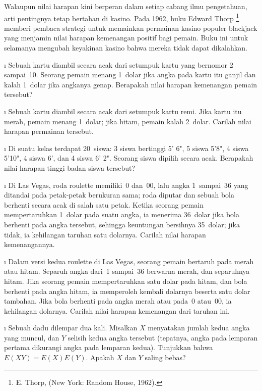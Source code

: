 Walaupun nilai harapan kini berperan dalam setiap cabang ilmu pengetahuan, arti
pentingnya tetap bertahan di kasino. Pada 1962, buku Edward Thorp
\footnote{E. Thorp,  (New York: Random
House, 1962).} memberi pembaca strategi untuk memainkan permainan kasino populer
blackjack yang menjamin nilai harapan kemenangan positif bagi pemain.
Buku ini untuk selamanya mengubah keyakinan kasino bahwa mereka tidak dapat dikalahkan.

\exercises
\begin{LJSItem}

\i\label{exer 6.1.1} Sebuah kartu diambil secara acak dari setumpuk kartu yang
bernomor 2 sampai~10. Seorang pemain menang 1~dolar jika angka pada kartu itu ganjil dan
kalah 1~dolar jika angkanya genap. Berapakah nilai harapan kemenangan pemain tersebut?

\i\label{exer 6.1.2} Sebuah kartu diambil secara acak dari setumpuk kartu remi. Jika
kartu itu merah, pemain menang 1~dolar; jika hitam, pemain kalah 2~dolar.
Carilah nilai harapan permainan tersebut.

\i\label{exer 6.1.3} Di suatu kelas terdapat 20~siswa: 3 siswa bertinggi 5' 6", 5 siswa 5'8", 4
siswa 5'10", 4 siswa 6', dan 4 siswa 6' 2". Seorang siswa dipilih secara acak. Berapakah
nilai harapan tinggi badan siswa tersebut?

\i\label{exer 6.1.4} Di Las Vegas, roda roulette memiliki~0 dan~00, lalu
angka 1~sampai~36 yang ditandai pada petak-petak berukuran sama; roda diputar dan sebuah bola berhenti secara acak di
salah satu petak. Ketika seorang pemain mempertaruhkan 1~dolar pada suatu angka, ia menerima 36~dolar jika
bola berhenti pada angka tersebut, sehingga keuntungan bersihnya 35~dolar; jika tidak, ia kehilangan
taruhan satu dolarnya. Carilah nilai harapan kemenangannya.

\i\label{exer 6.1.5} Dalam versi kedua roulette di Las Vegas, seorang pemain bertaruh
pada merah atau hitam. Separuh angka dari~1 sampai~36 berwarna merah, dan separuhnya hitam. Jika seorang
pemain mempertaruhkan satu dolar pada hitam, dan bola berhenti pada angka hitam, ia memperoleh kembali
dolarnya beserta satu dolar tambahan. Jika bola berhenti pada angka merah atau pada~0 atau~00, ia
kehilangan dolarnya. Carilah nilai harapan kemenangan dari taruhan ini.

\i\label{exer 6.1.6} Sebuah dadu dilempar dua kali. Misalkan $X$ menyatakan jumlah kedua
angka yang muncul, dan $Y$ selisih kedua angka tersebut (tepatnya, angka
pada lemparan pertama dikurangi angka pada lemparan kedua). Tunjukkan bahwa $E(XY) = E(X)E(Y)$. Apakah
$X$ dan $Y$ saling bebas?


\end{LJSItem}
